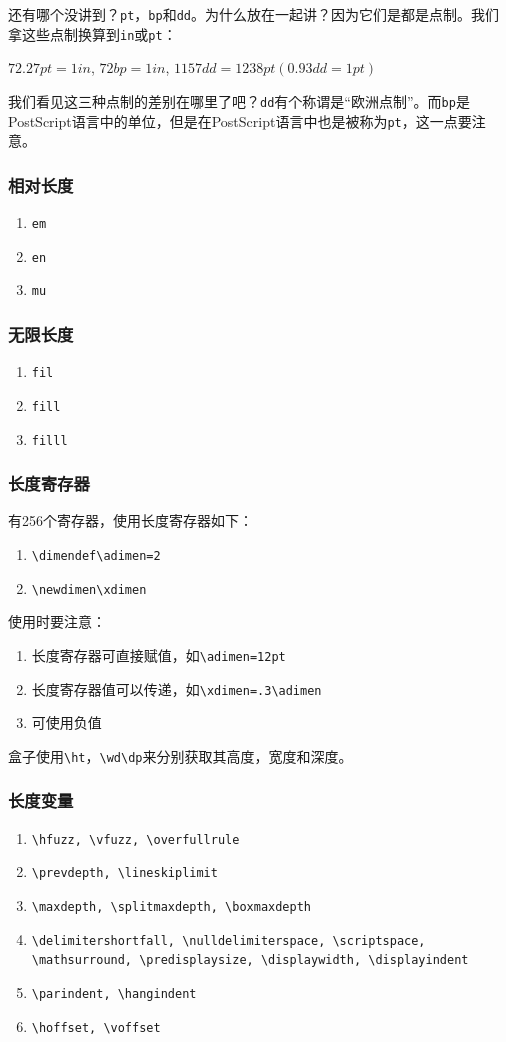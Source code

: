 \documentclass{article}
\begin{document}
还有哪个没讲到？\verb!pt!，\verb!bp!和\verb!dd!。为什么放在一起讲？因为它们是都是点制。我们拿这些点制换算到\verb!in!或\verb!pt!：
\begin{center}
$72.27pt=1in$, $72bp=1in$, $1157dd=1238pt(0.93dd=1pt)$
\end{center}

我们看见这三种点制的差别在哪里了吧？\verb!dd!有个称谓是“欧洲点制”。而\verb!bp!是PostScript语言中的单位，但是在PostScript语言中也是被称为\verb!pt!，这一点要注意。
\subsubsection{相对长度}
\begin{enumerate}
\item \verb!em!
\item \verb!en!
\item \verb!mu!
\end{enumerate}
\subsubsection{无限长度}
\begin{enumerate}
\item \verb!fil!
\item \verb!fill!
\item \verb!filll!
\end{enumerate}
\subsubsection{长度寄存器}
有256个寄存器，使用长度寄存器如下：
\begin{enumerate}
\item \verb!\dimendef\adimen=2!
\item \verb!\newdimen\xdimen!
\end{enumerate}
使用时要注意：
\begin{enumerate}
\item 长度寄存器可直接赋值，如\verb!\adimen=12pt!
\item 长度寄存器值可以传递，如\verb!\xdimen=.3\adimen!
\item 可使用负值 
\end{enumerate}
盒子使用\verb!\ht!，\verb!\wd!\verb!\dp!来分别获取其高度，宽度和深度。
\subsubsection{长度变量}
\begin{enumerate}
\item \verb!\hfuzz, \vfuzz, \overfullrule!
\item \verb!\prevdepth, \lineskiplimit!
\item \verb!\maxdepth, \splitmaxdepth, \boxmaxdepth!
\item \verb!\delimitershortfall, \nulldelimiterspace, \scriptspace, \mathsurround, \predisplaysize, \displaywidth, \displayindent!
\item \verb!\parindent, \hangindent!
\item \verb!\hoffset, \voffset!
\end{enumerate}
\end{document}
